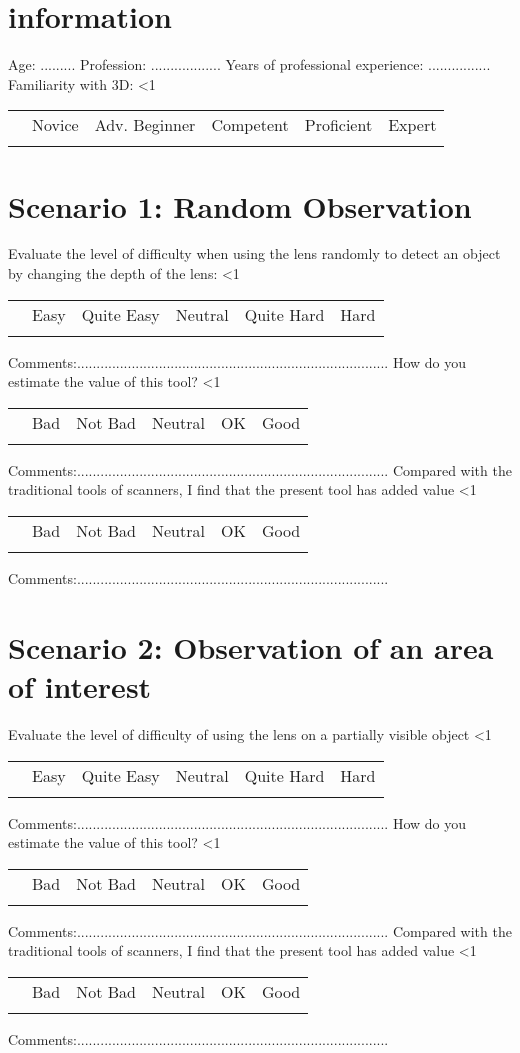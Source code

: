 \documentclass[a4paper]{exam}
\makeatletter
\newcounter{mquestion}
\newcounter{row}
\newcommand\addtabtoks[1]{\@tabtoks\expandafter{\the\@tabtoks#1}}
\newcommand*\resettabtoks{\@tabtoks{}}
\newcommand*\printtabtoks{\the\@tabtoks}
\newcommand\CheckTable[1]{%
  \setcounter{mquestion}{0}
  \setcounter{row}{0}
  \resettabtoks
  \loop\ifnum\therow<#1\relax
    \stepcounter{row}
    \addtabtoks{& $\square$ & $\square$ & $\square$ & $\square$ & $\square$ \\}%
  \repeat
  \begin{longtable}{>{\stepcounter{mquestion}}l*{5}{c}}
    \multicolumn{1}{c}{} & Bad & Not Bad & Neutral & OK & Good \\
    \printtabtoks
  \end{longtable}%
}
\newcommand\CheckTablelevel[1]{%
  \setcounter{mquestion}{0}
  \setcounter{row}{0}
  \resettabtoks
  \loop\ifnum\therow<#1\relax
    \stepcounter{row}
    \addtabtoks{& $\square$ & $\square$ & $\square$ & $\square$ & $\square$ \\}%
  \repeat
  \begin{longtable}{>{\stepcounter{mquestion}}l*{5}{c}}
    \multicolumn{1}{c}{} & Novice &  Adv. Beginner &  Competent & Proficient  & Expert \\
    \printtabtoks
  \end{longtable}%
}
\newcommand\CheckTableDifficulty[1]{%
  \setcounter{mquestion}{0}
  \setcounter{row}{0}
  \resettabtoks
  \loop\ifnum\therow<#1\relax
    \stepcounter{row}
    \addtabtoks{& $\square$ & $\square$ & $\square$ & $\square$ & $\square$ \\}%
  \repeat
  \begin{longtable}{>{\stepcounter{mquestion}}l*{5}{c}}
    \multicolumn{1}{c}{} & Easy & Quite Easy & Neutral & Quite Hard & Hard \\
    \printtabtoks
  \end{longtable}%
}
\makeatother
\begin{document}
\section{information}

 Age: ......... \newline
 Profession: .................. \newline
 Years of professional experience: ................ \newline
 Familiarity with 3D: 
\CheckTablelevel{1}

\section{Scenario 1: Random Observation }
Evaluate the level of difficulty when using the lens randomly to detect an object by changing the depth of the lens:
\CheckTableDifficulty{1}
Comments:................................................................................ \newline \newline
How do you estimate the value of this tool?
\CheckTable{1}
Comments:................................................................................ \newline \newline
Compared with the traditional tools of scanners, I find that the present tool has added value
\CheckTable{1}
Comments:................................................................................ \newline \newline

\section{Scenario 2: Observation of an area of interest }
Evaluate the level of difficulty of using the lens on a partially visible object
\CheckTableDifficulty{1}
Comments:................................................................................ \newline \newline
How do you estimate the value of this tool?
\CheckTable{1}
Comments:................................................................................ \newline \newline
Compared with the traditional tools of scanners, I find that the present tool has added value
\CheckTable{1}
Comments:................................................................................ \newline \newline
\end{document}
